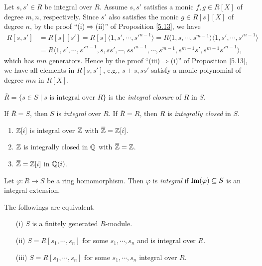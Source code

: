 \begin{note*}
    Let $s,s' \in R$ be integral over $R$. Assume $s,s'$ satisfies a monic $f,g \in R[X]$ of degree $m,n$, respectively. Since $s'$ also satisfies the monic $g \in R[s][X]$ of degree $n$, by the proof ``(i)$\Rightarrow$(ii)'' of Proposition \ref{5.13}, we have
    \begin{align*}
        R[s,s'] &= R[s][s'] = R[s]\langle 1,s',\cdots,s'^{n-1} \rangle = R\langle 1,s,\cdots,s^{m-1} \rangle \langle 1,s',\cdots,s'^{n-1} \rangle \\
        &= R\langle 1,s',\cdots,s'^{n-1},s,ss',\cdots,ss'^{n-1},\cdots,s^{m-1},s^{m-1}s',s^{m-1}s'^{n-1} \rangle,
    \end{align*}
    which has $mn$ generators. Hence by the proof ``(iii)$\Rightarrow$(i)'' of Proposition \ref{5.13}, we have all elements in $R[s,s']$, e.g., $s \pm s,ss'$ satisfy a monic polynomial of degree $mn$ in $R[X]$.
\end{note*}

\begin{definition}\label{5.16}
    $\overbar{R} = \{s \in S \mid s \text{ is integral over }R\}$ is the \emph{integral closure} of $R$ in $S$. \par 
    If $\overbar{R} = S$, then $S$ is \emph{integral} over $R$. If $\overbar{R} = R$, then $R$ is \emph{integrally closed} in $S$.
\end{definition}

\begin{example}\label{5.17}
    \begin{enumerate}
        \item $\mathbb{Z}[i]$ is integral over $\mathbb{Z}$ with $\overbar{\bbZ} = \bbZ[i]$.
        \item $\mathbb{Z}$ is integrally closed in $\mathbb{Q}$ with $\overbar{\bbZ} = \bbZ$. 
        \item $\overbar{\bbZ} = \bbZ[i]$ in $\mathbb{Q}(i)$.
    \end{enumerate}
\end{example}

\begin{definition}\label{5.18}
    Let $\varphi: R \to S$ be a ring homomorphism. Then $\varphi$ is \emph{integral} if $\operatorname{Im}(\varphi) \subseteq S$ is an integral extension.
\end{definition}

\begin{theorem}\label{5.19}
    The followings are equivalent.
    \begin{enumerate}
        \item[(i)]
            $S$ is a finitely generated $R$-module.
        \item[(ii)]
            $S = R[s_1,\cdots,s_n]$ for some $s_1,\cdots,s_n$ and is integral over $R$. 
        \item[(iii)] $S = R[s_1,\cdots,s_n]$ for some $s_1,\cdots,s_n$ integral over $R$.
    \end{enumerate}
\end{theorem}


